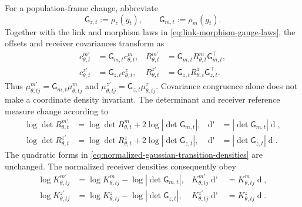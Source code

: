 For a population-frame change, abbreviate
\begin{equation}
\mathsf G_{z,t}:=\rho_z(g_t),
\qquad
\mathsf G_{m,t}:=\rho_m(g_t).
\label{eq:generative-coordinate-change-matrices}
\end{equation}
Together with the link and morphism laws in \cref{eq:link-morphism-gauge-laws}, the offsets and receiver covariances transform as
\begin{equation}
\begin{aligned}
c_{\theta,t}^{m\prime}&=\mathsf G_{m,t}c_{\theta,t}^m,
&R_{\theta,t}^{m\prime}
&=\mathsf G_{m,t}R_{\theta,t}^m\mathsf G_{m,t}^{\top},\\
c_{\theta,t}^{z\prime}&=\mathsf G_{z,t}c_{\theta,t}^z,
&R_{\theta,t}^{z\prime}
&=\mathsf G_{z,t}R_{\theta,t}^z\mathsf G_{z,t}^{\top}.
\end{aligned}
\label{eq:transition-offset-covariance-gauge-laws}
\end{equation}
Thus $\mu_{\theta,tj}^{m\prime}=\mathsf G_{m,t}\mu_{\theta,tj}^m$ and $\mu_{\theta,tj}^{z\prime}=\mathsf G_{z,t}\mu_{\theta,tj}^z$.  Covariance congruence alone does not make a coordinate density invariant.  The determinant and receiver reference measure change according to
\begin{equation}
\begin{aligned}
\log\det R_{\theta,t}^{m\prime}
&=\log\det R_{\theta,t}^m+2\log|\det\mathsf G_{m,t}|,
&\mathop{\mathrm d\lambda_{m,t}'(m_t')}
&=|\det\mathsf G_{m,t}|\mathop{\mathrm d\lambda_{m,t}(m_t)},\\
\log\det R_{\theta,t}^{z\prime}
&=\log\det R_{\theta,t}^z+2\log|\det\mathsf G_{z,t}|,
&\mathop{\mathrm d\lambda_{z,t}'(z_t')}
&=|\det\mathsf G_{z,t}|\mathop{\mathrm d\lambda_{z,t}(z_t)}.
\end{aligned}
\label{eq:receiver-logdet-measure-jacobians}
\end{equation}
The quadratic forms in \cref{eq:normalized-gaussian-transition-densities} are unchanged.  The normalized receiver densities consequently obey
\begin{equation}
\begin{aligned}
\log K_{\theta,tj}^{m\prime}
&=\log K_{\theta,tj}^m-\log|\det\mathsf G_{m,t}|,
&K_{\theta,tj}^{m\prime}\mathop{\mathrm d\lambda_{m,t}' }
&=K_{\theta,tj}^m\mathop{\mathrm d\lambda_{m,t}},\\
\log K_{\theta,tj}^{z\prime}
&=\log K_{\theta,tj}^z-\log|\det\mathsf G_{z,t}|,
&K_{\theta,tj}^{z\prime}\mathop{\mathrm d\lambda_{z,t}' }
&=K_{\theta,tj}^z\mathop{\mathrm d\lambda_{z,t}}.
\end{aligned}
\label{eq:receiver-density-kernel-measure-invariance}
\end{equation}
